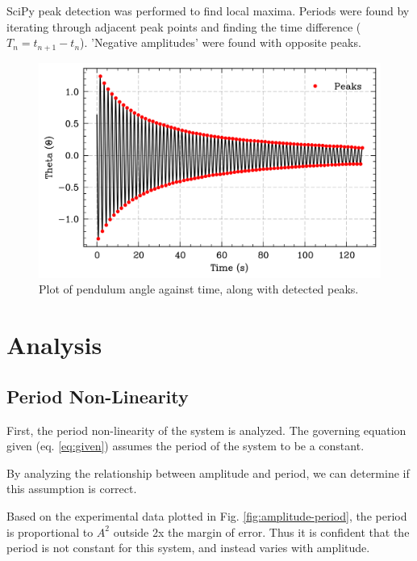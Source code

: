 \documentclass[prl,twocolumn,amsmath,amssymb,superscriptaddress]{revtex4-2}
\begin{document}
SciPy peak detection was performed to find local maxima. Periods were found by iterating through adjacent peak points and finding the time difference ($T_n=t_{n+1}-t_{n}$). 'Negative amplitudes' were found with opposite peaks.

\begin{figure}[htb]
    \includegraphics[width=0.8\linewidth]{angle_time.png}
    \caption{Plot of pendulum angle against time, along with detected peaks.}
    \label{fig:angle_time}
\end{figure}

\section{Analysis}


\subsection{Period Non-Linearity}

First, the period non-linearity of the system is analyzed. The governing equation given (eq. \ref{eq:given}) assumes the period of the system to be a constant.

By analyzing the relationship between amplitude and period, we can determine if this assumption is correct.

Based on the experimental data plotted in Fig. \ref{fig:amplitude-period}, the period is proportional to $A^2$ outside 2x the margin of error. Thus it is confident that the period is not constant for this system, and instead varies with amplitude.
\end{document}
